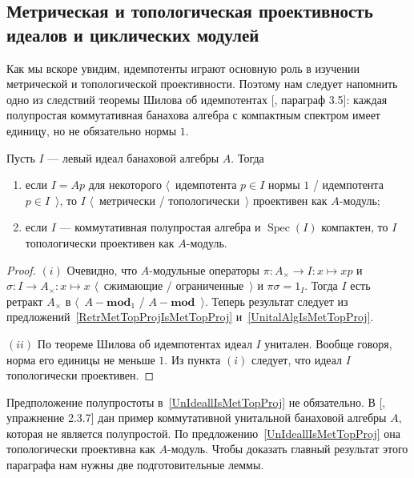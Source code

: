 
\subsection{
    Метрическая и топологическая проективность идеалов и циклических модулей
}\label{
    SubSectionMetricAndTopologicalProjectivityOfIdealsAndCyclicModules
}

Как мы вскоре увидим, идемпотенты играют основную роль в изучении метрической и
топологической проективности. Поэтому нам следует напомнить одно из следствий
теоремы Шилова об идемпотентах [\cite{KaniBanAlg}, параграф 3.5]: каждая
полупростая коммутативная банахова алгебра с компактным спектром имеет единицу,
но не обязательно нормы $1$. 

\begin{proposition}\label{UnIdeallIsMetTopProj} Пусть $I$ --- левый идеал
банаховой алгебры $A$. Тогда
\begin{enumerate}[label = (\roman*)]
    \item если $I=Ap$ для некоторого $\langle$~идемпотента $p\in I$ нормы $1$ /
    идемпотента $p\in I$~$\rangle$, то $I$ $\langle$~метрически /
    топологически~$\rangle$ проективен как $A$-модуль;

    \item если $I$ --- коммутативная полупростая алгебра и
    $\operatorname{Spec}(I)$ компактен, то $I$ топологически проективен как
    $A$-модуль.
\end{enumerate}
\end{proposition}
\begin{proof} 
$(i)$ Очевидно, что $A$-модульные операторы $\pi:A_\times\to I:x\mapsto xp$ и
$\sigma:I\to A_\times:x\mapsto x$ $\langle$~сжимающие / ограниченные~$\rangle$ и
$\pi\sigma=1_I$. Тогда $I$ есть ретракт $A_\times$ в
$\langle$~$A-\mathbf{mod}_1$ / $A-\mathbf{mod}$~$\rangle$. Теперь результат
следует из предложений~\ref{RetrMetTopProjIsMetTopProj}
и~\ref{UnitalAlgIsMetTopProj}.

$(ii)$ По теореме Шилова об идемпотентах идеал $I$ унитален. Вообще говоря, норма
его единицы не меньше $1$. Из пункта $(i)$ следует, что идеал $I$ топологически
проективен.
\end{proof}

Предположение полупростоты в~\ref{UnIdeallIsMetTopProj} не обязательно. В
[\cite{DalesIntroBanAlgOpHarmAnal}, упражнение 2.3.7] дан пример коммутативной
унитальной банаховой алгебры $A$, которая не является полупростой. По
предложению~\ref{UnIdeallIsMetTopProj} она топологически проективна как
$A$-модуль. Чтобы доказать главный результат этого параграфа нам нужны две
подготовительные леммы.

